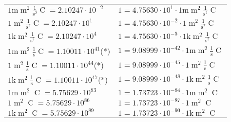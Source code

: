\begin{center}
\begin{longtable}{l l}
{\color{gray}$1 \bm{\mathrm{ m}}{\operatorname{m}^2}\frac1{\operatorname{s}^2}{\operatorname{C}}{} = 2.10247\cdot10^{-2} $}   & {\color{gray}$ 1 = 4.75630\cdot10^{1} \cdot 1 \bm{\mathrm{ m}}{\operatorname{m}^2}\frac1{\operatorname{s}^2}{\operatorname{C}}{}$}  \\
{\color{black}$1 \bm{\mathrm{ }}{\operatorname{m}^2}\frac1{\operatorname{s}^2}{\operatorname{C}}{} = 2.10247\cdot10^{1} $}   & {\color{black}$ 1 = 4.75630\cdot10^{-2} \cdot 1 \bm{\mathrm{ }}{\operatorname{m}^2}\frac1{\operatorname{s}^2}{\operatorname{C}}{}$}  \\
{\color{gray}$1 \bm{\mathrm{ k}}{\operatorname{m}^2}\frac1{\operatorname{s}^2}{\operatorname{C}}{} = 2.10247\cdot10^{4} $}   & {\color{gray}$ 1 = 4.75630\cdot10^{-5} \cdot 1 \bm{\mathrm{ k}}{\operatorname{m}^2}\frac1{\operatorname{s}^2}{\operatorname{C}}{}$}  \\
{\color{gray}$1 \bm{\mathrm{ m}}{\operatorname{m}^2}\frac1{\operatorname{s}}{\operatorname{C}}{} = 1.10011\cdot10^{41} $}\quad(*) & {\color{gray}$ 1 = 9.08999\cdot10^{-42} \cdot 1 \bm{\mathrm{ m}}{\operatorname{m}^2}\frac1{\operatorname{s}}{\operatorname{C}}{}$}  \\
{\color{black}$1 \bm{\mathrm{ }}{\operatorname{m}^2}\frac1{\operatorname{s}}{\operatorname{C}}{} = 1.10011\cdot10^{44} $}\quad(*) & {\color{black}$ 1 = 9.08999\cdot10^{-45} \cdot 1 \bm{\mathrm{ }}{\operatorname{m}^2}\frac1{\operatorname{s}}{\operatorname{C}}{}$}  \\
{\color{gray}$1 \bm{\mathrm{ k}}{\operatorname{m}^2}\frac1{\operatorname{s}}{\operatorname{C}}{} = 1.10011\cdot10^{47} $}\quad(*) & {\color{gray}$ 1 = 9.08999\cdot10^{-48} \cdot 1 \bm{\mathrm{ k}}{\operatorname{m}^2}\frac1{\operatorname{s}}{\operatorname{C}}{}$}  \\
{\color{gray}$1 \bm{\mathrm{ m}}{\operatorname{m}^2}{}{\operatorname{C}}{} = 5.75629\cdot10^{83} $}   & {\color{gray}$ 1 = 1.73723\cdot10^{-84} \cdot 1 \bm{\mathrm{ m}}{\operatorname{m}^2}{}{\operatorname{C}}{}$}  \\
{\color{black}$1 \bm{\mathrm{ }}{\operatorname{m}^2}{}{\operatorname{C}}{} = 5.75629\cdot10^{86} $}   & {\color{black}$ 1 = 1.73723\cdot10^{-87} \cdot 1 \bm{\mathrm{ }}{\operatorname{m}^2}{}{\operatorname{C}}{}$}  \\
{\color{gray}$1 \bm{\mathrm{ k}}{\operatorname{m}^2}{}{\operatorname{C}}{} = 5.75629\cdot10^{89} $}   & {\color{gray}$ 1 = 1.73723\cdot10^{-90} \cdot 1 \bm{\mathrm{ k}}{\operatorname{m}^2}{}{\operatorname{C}}{}$}  \\

\end{longtable}
\end{center}

